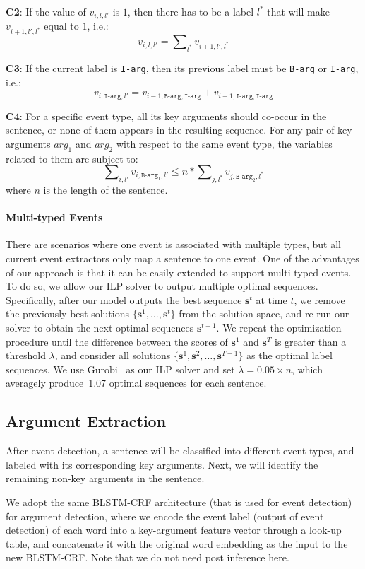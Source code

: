 \textbf{C2}: If the value of $v_{i,l,l'}$ is $1$, then there has to be a label $l^*$ that will make $v_{i+1,l',l^*}$ equal to $1$, i.e.:
\begin{equation}
	v_{i,l,l'} = \sum\nolimits_{l^*}v_{i+1,l',l^*}
\end{equation}

\textbf{C3}: If the current label is \texttt{I-arg}, then its previous label must be \texttt{B-arg} or \texttt{I-arg}, i.e.:
\begin{equation}
	v_{i,\texttt{I-arg},l'} = v_{i-1,\texttt{B-arg},\texttt{I-arg}} + v_{i-1, \texttt{I-arg}, \texttt{I-arg}}
\end{equation}

\textbf{C4}: For a specific event type, all its key arguments should co-occur in the sentence, or none of them appears in the resulting sequence. For any pair of key arguments $arg_1$ and $arg_2$ with respect to the same event type, the variables related to them are subject to:
\begin{equation}
	\sum\nolimits_{i,l'}{v_{i,\texttt{B-arg}_1,l'}} \leq n * \sum\nolimits_{j,l^*}{v_{j,\texttt{B-arg}_2,l^*}}
\end{equation}
where $n$ is the length of the sentence.

\paragraph{Multi-typed Events}
There are scenarios where one event is associated with multiple types, but all current event extractors only map a sentence to one event.
 One of the advantages of our approach is that it can be easily extended to support multi-typed events.
To do so, we allow our ILP solver to output multiple optimal sequences. Specifically, after our model outputs the best sequence $\bm{s}^t$
at time $t$, we remove the previously best solutions
 $\{\bm{s}^1, \ldots, \bm{s}^{t}\}$ from the solution space, and re-run our solver to obtain the next optimal sequences $\bm{s}^{t+1}$.
We repeat the optimization procedure until the difference between the scores of $\bm{s}^1$ and $\bm{s}^T$ is greater
than a threshold $\lambda$, and consider all solutions $\{\bm{s}^1, \bm{s}^2, \ldots, \bm{s}^{T-1}\}$ as the optimal label sequences.
We use Gurobi~\cite{gurobi} as our ILP solver and set $\lambda=0.05 \times n$, which averagely produce~1.07 optimal sequences for each sentence.

\subsection{Argument Extraction}
After event detection, a sentence will be classified into different event types, and labeled with its corresponding key arguments.
Next, we will identify the remaining non-key arguments in the sentence.

We adopt the same BLSTM-CRF architecture (that is used for event detection) for argument detection, where we encode the event label (output
of event detection) of each word into a key-argument feature vector through a look-up table, and concatenate it with the original word
embedding as the input to the new BLSTM-CRF. Note that we do not need post inference here.

